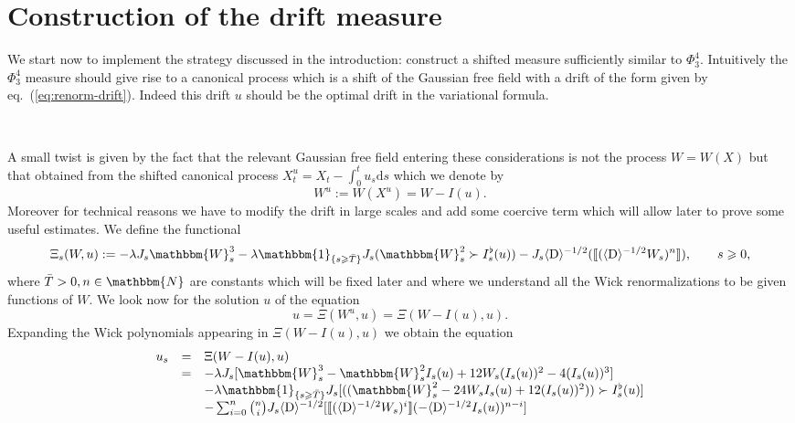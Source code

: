 \documentclass[11pt]{article}
\newcommand{\assign}{:=}
\newcommand{\mathD}{\mathrm{D}}
\newcommand{\mathd}{\mathrm{d}}
\begin{document}
\section{Construction of the drift measure}

We start now to implement the strategy discussed in the introduction:
construct a shifted measure sufficiently similar to $\Phi^4_3$. Intuitively
the $\Phi^4_3$ measure should give rise to a canonical process which is a
shift of the Gaussian free field with a drift of the form given by
eq.~(\ref{eq:renorm-drift}). Indeed this drift $u$ should be the optimal drift
in the variational formula.

\

A small twist is given by the fact that the relevant Gaussian free field
entering these considerations is not the process $W = W (X)$ but that obtained
from the shifted canonical process $X^u_t = X_t - \int_0^t u_s \mathd s$ which
we denote by
\[ W^u \assign W (X^u) = W - I (u) . \]
Moreover for technical reasons we have to modify the drift in large scales and
add some coercive term which will allow later to prove some useful estimates.
We define the functional
\begin{equation}
  \Xi_s (W, u) \assign - \lambda J_s \mathbbm{W}_s^3 - \lambda \mathbbm{1}_{\{
  s \geqslant \bar{T} \}} J_s (\mathbbm{W}_s^2 \succ I_s^{\flat} (u)) - J_s
  \langle \mathD \rangle^{- 1 / 2} (\llbracket (\langle \mathD \rangle^{- 1 /
  2} W_s)^n \rrbracket), \qquad s \geqslant 0, \label{eq:pre-pre-drift}
\end{equation}
where $\bar{T} > 0, n \in \mathbbm{N}$ are constants which will be fixed later
and where we understand all the Wick renormalizations to be given functions of
$W$. We look now for the solution $u$ of the equation
\begin{equation}
  u = \Xi (W^u, u) = \Xi (W - I (u), u) . \label{eq:pre-drift}
\end{equation}
Expanding the Wick polynomials appearing in $\Xi (W - I (u), u)$ we obtain the
equation
\begin{equation}
  \begin{array}{lll}
    u_s & = & \Xi (W - I (u), u)\\
    & = & - \lambda J_s [\mathbbm{W}_s^3 -\mathbbm{W}_s^2 I_s (u) + 12 W_s
    (I_s (u))^2 - 4 (I_s (u))^3]\\
    &  & - \lambda \mathbbm{1}_{\{ s \geqslant \bar{T} \}} J_s
    [((\mathbbm{W}_s^2 - 24 W_s I_s (u) + 12 (I_s (u))^2)) \succ I_s^{\flat}
    (u)]\\
    &  & - \sum_{i = 0}^n \binom{n}{i} J_s \langle \mathD \rangle^{- 1 / 2}
    [\llbracket (\langle \mathD \rangle^{- 1 / 2} W_s)^i \rrbracket (- \langle
    \mathD \rangle^{- 1 / 2} I_s (u))^{n - i}]
  \end{array} \label{eq:drift}
\end{equation}
\end{document}
